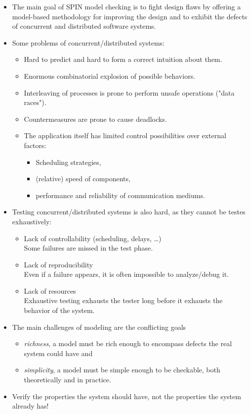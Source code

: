 \begin{itemize}
	\item The main goal of SPIN model checking is to fight design flaws by offering a model-based methodology for improving the design and to exhibit the defects of concurrent and distributed software systems.
	\item Some problems of concurrent/distributed systems:
		\begin{itemize}
			\item Hard to predict and hard to form a correct intuition about them.
			\item Enormous combinatorial explosion of possible behaviors.
			\item Interleaving of processes is prone to perform unsafe operations ("data races").
			\item Countermeasures are prone to cause deadlocks.
			\item The application itself has limited control possibilities over external factors:
				\begin{itemize}
					\item Scheduling strategies,
					\item (relative) speed of components,
					\item performance and reliability of communication mediums.
				\end{itemize}
		\end{itemize}
	\item Testing concurrent/distributed systems is also hard, as they cannot be testes exhaustively:
		\begin{itemize}
			\item Lack of controllability (scheduling, delays, \dots) \\
				Some failures are missed in the test phase.
			\item Lack of reproducibility \\
				Even if a failure appears, it is often impossible to analyze/debug it.
			\item Lack of resources \\
				Exhaustive testing exhausts the tester long before it exhausts the behavior of the system.
		\end{itemize}
	\item The main challenges of modeling are the conflicting goals
		\begin{itemize}
			\item \textit{richness}, a model must be rich enough to encompass defects the real system could have and
			\item \textit{simplicity}, a model must be simple enough to be checkable, both theoretically and in practice.
		\end{itemize}
	\item Verify the properties the system should have, not the properties the system already has!
\end{itemize}

